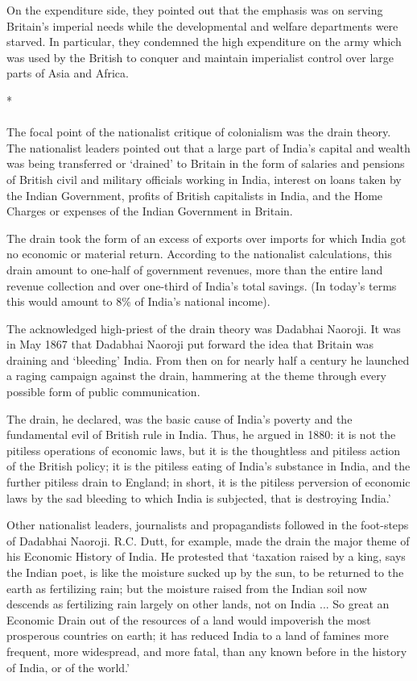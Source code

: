 On the expenditure side, they pointed out that the emphasis was on serving Britain's imperial needs while the developmental and welfare departments were starved. In particular, they condemned the high expenditure on the army which was used by the British to conquer and maintain imperialist control over large parts of Asia and Africa.

\begin{center}*\end{center}

\paragraph*{}

The focal point of the nationalist critique of colonialism was the drain theory. The nationalist leaders pointed out that a large part of India's capital and wealth was being transferred or `drained' to Britain in the form of salaries and pensions of British civil and military officials working in India, interest on loans taken by the Indian Government, profits of British capitalists in India, and the Home Charges or expenses of the Indian Government in Britain.

The drain took the form of an excess of exports over imports for which India got no economic or material return. According to the nationalist calculations, this drain amount to one-half of government revenues, more than the entire land revenue collection and over one-third of India's total savings. (In today's terms this would amount to 8\% of India's national income).

The acknowledged high-priest of the drain theory was Dadabhai Naoroji. It was in May 1867 that Dadabhai Naoroji put forward the idea that Britain was draining and `bleeding' India. From then on for nearly half a century he launched a raging campaign against the drain, hammering at the theme through every possible form of public communication.

The drain, he declared, was the basic cause of India's poverty and the fundamental evil of British rule in India. Thus, he argued in 1880: it is not the pitiless operations of economic laws, but it is the thoughtless and pitiless action of the British policy; it is the pitiless eating of India's substance in India, and the further pitiless drain to England; in short, it is the pitiless perversion of economic laws by the sad bleeding to which India is subjected, that is destroying India.'

Other nationalist leaders, journalists and propagandists followed in the foot-steps of Dadabhai Naoroji. R.C. Dutt, for example, made the drain the major theme of his Economic History of India. He protested that `taxation raised by a king, says the Indian poet, is like the moisture sucked up by the sun, to be returned to the earth as fertilizing rain; but the moisture raised from the Indian soil now descends as fertilizing rain largely on other lands, not on India ... So great an Economic Drain out of the resources of a land would impoverish the most prosperous countries on earth; it has reduced India to a land of famines more frequent, more widespread, and more fatal, than any known before in the history of India, or of the world.'

